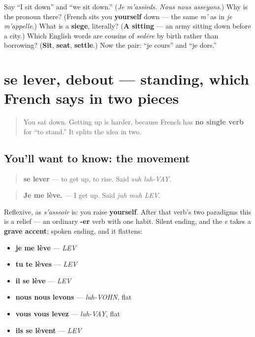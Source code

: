 \begin{tcolorbox}[breakable,colback=teal!4,colframe=teal!35!black,title={Before you move on}]
Say \textquotedblleft{}I sit down\textquotedblright{} and \textquotedblleft{}we sit down.\textquotedblright{} (\emph{Je m'assieds. Nous nous asseyons}.) Why is the pronoun there? (French sits you \textbf{yourself} down — the same \emph{m'} as in \emph{je m'appelle}.) What is a \textbf{siege}, literally? (\textbf{A sitting} — an army sitting down before a city.) Which English words are cousins of \emph{sedēre} by birth rather than borrowing? (\textbf{Sit}, \textbf{seat}, \textbf{settle}.) Now the pair: \textquotedblleft{}je cours\textquotedblright{} and \textquotedblleft{}je dors.\textquotedblright{}
\end{tcolorbox}
\section[se lever, debout]{se lever, debout — standing, which French says in two pieces}

\label{lesson:FR-C27-se-lever}



\begin{quote}
You sat down. Getting up is harder, because French has \textbf{no single verb} for \textquotedblleft{}to stand.\textquotedblright{} It splits the idea in two.
\end{quote}

\subsection*{You'll want to know: the movement}
\begin{quote}
\textbf{se lever} — to get up, to rise. Said \emph{suh luh-VAY}.
\end{quote}

\begin{quote}
\textbf{Je me lève.} — I get up. Said \emph{juh muh LEV}.
\end{quote}

Reflexive, as \emph{s'asseoir} is: you raise \textbf{yourself}. After that verb's two paradigms this is a relief — an ordinary \textbf{-er} verb with one habit. Silent ending, and the \emph{e} takes a \textbf{grave accent}; spoken ending, and it flattens:

\begin{itemize}
\raggedright
  \item \textbf{je me lève} — \emph{LEV}
  \item \textbf{tu te lèves} — \emph{LEV}
  \item \textbf{il se lève} — \emph{LEV}
  \item \textbf{nous nous levons} — \emph{luh-VOHN}, flat
  \item \textbf{vous vous levez} — \emph{luh-VAY}, flat
  \item \textbf{ils se lèvent} — \emph{LEV}
\end{itemize}

